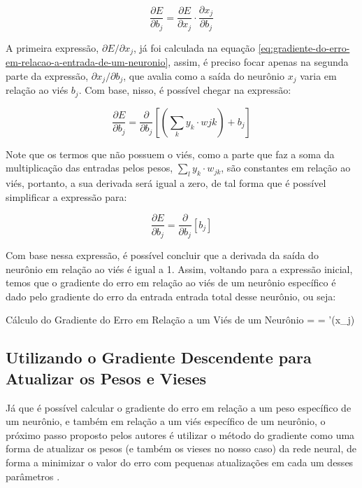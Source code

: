 \[
    \frac{\partial E}{\partial b_j} = \frac{\partial E}{\partial x_j} \cdot \frac{\partial x_j}{\partial b_j}
\]

A primeira expressão, $\partial E / \partial x_j$, já foi calculada na equação \ref{eq:gradiente-do-erro-em-relacao-a-entrada-de-um-neuronio}, assim, é preciso focar apenas na segunda parte da expressão, $\partial x_j / \partial b_j$, que avalia como a saída do neurônio $x_j$ varia em relação ao viés $b_j$. Com base, nisso, é possível chegar na expressão:

\[
    \frac{\partial E}{\partial b_j} = \frac{\partial}{\partial b_j} \left[ \left( \sum_k y_k \cdot w{jk} \right) + b_j \right]
\]

Note que os termos que não possuem o viés, como a parte que faz a soma da multiplicação das entradas pelos pesos, $\sum_l y_k \cdot w_{jk}$, são constantes em relação ao viés, portanto, a sua derivada será igual a zero, de tal forma que é possível simplificar a expressão para:

\[
        \frac{\partial E}{\partial b_j} = \frac{\partial}{\partial b_j} \left[ b_j \right]
\]

Com base nessa expressão, é possível concluir que a derivada da saída do neurônio em relação ao viés é igual a 1. Assim, voltando para a expressão inicial, temos que o gradiente do erro em relação ao viés de um neurônio específico é dado pelo gradiente do erro da entrada entrada total desse neurônio, ou seja:

\begin{equacaodestaque}{Cálculo do Gradiente do Erro em Relação a um Viés de um Neurônio}
     =   =  \cdot \sigma'(x_j)
    \label{eq:gradiente-do-erro-em-relacao-a-um-vies-de-um-neuronio}
\end{equacaodestaque}

\subsection{Utilizando o Gradiente Descendente para Atualizar os Pesos e Vieses}

Já que é possível calcular o gradiente do erro em relação a um peso específico de um neurônio, e também em relação a um viés específico de um neurônio, o próximo passo proposto pelos autores é utilizar o método do gradiente como uma forma de atualizar os pesos (e também os vieses no nosso caso) da rede neural, de forma a minimizar o valor do erro com pequenas atualizações em cada um desses parâmetros \parencite{BackpropagationArticle}.


